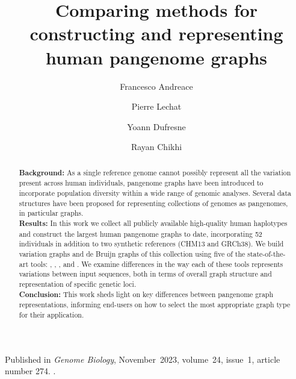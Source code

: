 \author
{
	Francesco Andreace
	\and
	Pierre Lechat
	\and
	Yoann Dufresne
	\and
	Rayan Chikhi
}
\title{Comparing methods for constructing and representing human pangenome graphs}

\metadata
{
	Published in \emph{Genome Biology},
	November~2023,
	volume~24,
	issue~1,
	article number 274.
	.
}
\maketitle
\label{pap:first}

\begin{abstract}
	\textbf{Background:} As a single reference genome cannot possibly represent all the variation present across human individuals, pangenome graphs have been introduced to incorporate population diversity within a wide range of genomic analyses. Several data structures have been proposed for representing collections of genomes as pangenomes, in particular graphs. \\
	\noindent \textbf{Results:} In this work we collect all publicly available high-quality human haplotypes and construct the largest human pangenome graphs to date, incorporating 52 individuals in addition to two synthetic references (CHM13 and GRCh38). We build variation graphs and de Bruijn graphs of this collection using five of the state-of-the-art tools: \bifrost, \mdbg, \minigraph, \mcactus and \pggb. We examine differences in the way each of these tools represents variations between input sequences, both in terms of overall graph structure and representation of specific genetic loci. \\
	\noindent \textbf{Conclusion:} This work sheds light on key differences between pangenome graph representations, informing end-users on how to select the most appropriate graph type for their application.
\end{abstract}

\startcontents[chapters]

